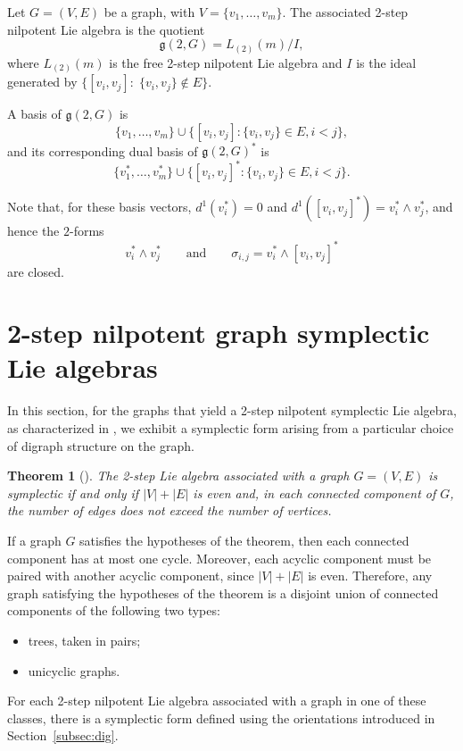 \documentclass[a4paper,11pt]{amsart}
\newtheorem*{thm}{Theorem}
\theoremstyle{definition}
\theoremstyle{remark}
\numberwithin{equation}{section}
\newcommand{\g}{\mathfrak{g}}
\begin{document}
Let $G=(V,E)$ be a graph, with $V=\{v_1,\dots,v_m\}$.
The associated 2-step nilpotent Lie algebra is the quotient  
\[ \g(2,G)=L_{(2)}(m)/I, \]
where  $L_{(2)}(m)$ is the free 2-step nilpotent Lie algebra and $I$ is the ideal
generated by $\{[v_i, v_j]:\; \{v_i,v_j\}\not\in E \}$.

A basis of $\g(2,G)$ is 
\[\{ v_1,\dots,v_m\}\cup \{[v_i,v_j] : \{v_i,v_j\}\in E, i<j\}, \]
 and its corresponding dual basis of $\g(2,G)^*$ is
\[ \{ v_1^*,\dots,v_m^*\}\cup \{[v_i,v_j]^*: \{v_i,v_j\}\in E, i<j\}. \]

Note that, for these basis vectors, $d^1(v_i^*)=0$ and $d^1([v_i,v_j]^*)=v_i^*\wedge v_j^*$,
and hence the $2$-forms
\begin{equation}\label{eqn:sigma-ij}
	v_i^* \wedge v_j^* \qquad\text{and}\qquad \sigma_{i,j}=v_i^*\wedge[v_i,v_j]^*
    \end{equation}
are closed.



\section{2-step nilpotent graph symplectic Lie algebras}\label{sec:2-gr}

In this section, for the graphs that yield a 2-step nilpotent symplectic Lie algebra, as characterized in \cite{PT}, we exhibit a symplectic form arising from a particular choice of digraph structure on the graph.

\begin{thm}[\cite{PT}]
The 2-step Lie algebra associated with a graph $G=(V,E)$ is symplectic if and only if
$|V|+|E|$ is even and, in each connected component of $G$, the number of edges does not exceed the number of vertices.
\end{thm}

If a graph $G$ satisfies the hypotheses of the theorem, then each connected component has at most one cycle. Moreover, each acyclic component must be paired with another acyclic component, since $|V|+|E|$ is even. Therefore, any graph satisfying the hypotheses of the theorem is a disjoint union of connected components of the following two types:
\begin{itemize}
	\item trees, taken in pairs;
	\item unicyclic graphs.
\end{itemize}

For each 2-step nilpotent Lie algebra associated with a graph in one of these classes, there is a symplectic form defined using the orientations introduced in Section~\ref{subsec:dig}.
\end{document}
